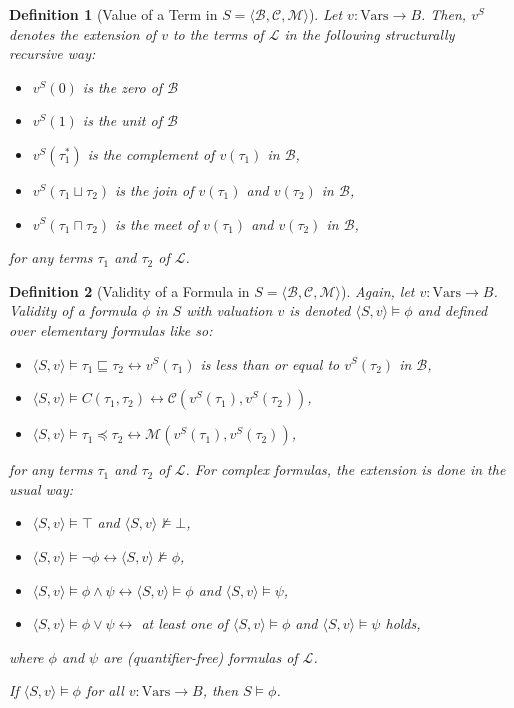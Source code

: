 \documentclass{article}
\newtheorem*{definition}{Definition}
\newcommand{\B}{\mathcal{B}}
\newcommand{\lang}{\mathcal{L}}
\newcommand{\Vars}{\text{Vars}}
\newcommand{\lcup}{\sqcup}
\newcommand{\lcap}{\sqcap}
\newcommand{\lstar}{^*}
\newcommand{\lpart}{\sqsubseteq}
\newcommand{\lcont}{C}
\newcommand{\lmeasure}{\preceq}
\begin{document}
\begin{definition}[Value of a Term in $S = \langle \B, \mathcal{C}, \mathcal{M} \rangle$]
  Let $v: \Vars \rightarrow B$. Then,  $v^S$ denotes the extension of $v$ to the terms of $\lang$ in the following structurally recursive way:
  \begin{itemize}
  \item $v^S(0)$ is the zero of $\B$
  \item $v^S(1)$ is the unit of $\B$
  \item $v^S(\tau_1 \lstar)$ is the complement of $v(\tau_1)$ in $\B$,
  \item $v^S(\tau_1 \lcup \tau_2)$ is the join of $v(\tau_1)$ and $v(\tau_2)$ in $\B$,
  \item $v^S(\tau_1 \lcap \tau_2)$ is the meet of $v(\tau_1)$ and $v(\tau_2)$ in $\B$,
  \end{itemize}
for any terms $\tau_1$ and $\tau_2$ of $\lang$.

\end{definition}

\begin{definition}[Validity of a Formula in $S = \langle \B, \mathcal{C}, \mathcal{M} \rangle$]
  Again, let $v: \Vars \rightarrow B$. Validity of a formula $\phi$ in $S$ with valuation $v$ is denoted $\langle S, v \rangle \models \phi$ and defined over elementary formulas like so:
  \begin{itemize}
  \item $\langle S, v \rangle \models \tau_1 \lpart \tau_2 \longleftrightarrow v^S(\tau_1)$ is less than or equal to $v^S(\tau_2)$ in $\B$,
  \item $\langle S, v \rangle \models \lcont(\tau_1, \tau_2) \longleftrightarrow \mathcal{C}(v^S(\tau_1), v^S(\tau_2))$,
  \item $\langle S, v \rangle \models \tau_1 \lmeasure \tau_2 \longleftrightarrow \mathcal{M}(v^S(\tau_1), v^S(\tau_2))$,
  \end{itemize}
  for any terms $\tau_1$ and $\tau_2$ of $\lang$. For complex formulas, the extension is done in the usual way:
  \begin{itemize}
  \item $\langle S, v \rangle \models \top$ and $\langle S, v \rangle \not \models \bot$,
  \item $\langle S, v \rangle \models \lnot \phi \longleftrightarrow \langle S, v \rangle \not\models \phi$,
  \item $\langle S, v \rangle \models \phi \land \psi \longleftrightarrow \langle S, v \rangle \models \phi$ and $\langle S, v \rangle \models \psi$,
  \item $\langle S, v \rangle \models \phi \lor \psi \longleftrightarrow$ at least one of  $\langle S, v \rangle \models \phi$ and $\langle S, v \rangle \models \psi$ holds,
  \end{itemize}
  where $\phi$ and $\psi$ are (quantifier-free) formulas of $\lang$.

  If $\langle S, v \rangle \models \phi$ for all $v: \Vars \rightarrow B$, then $S \models \phi$.
\end{definition}
\end{document}
